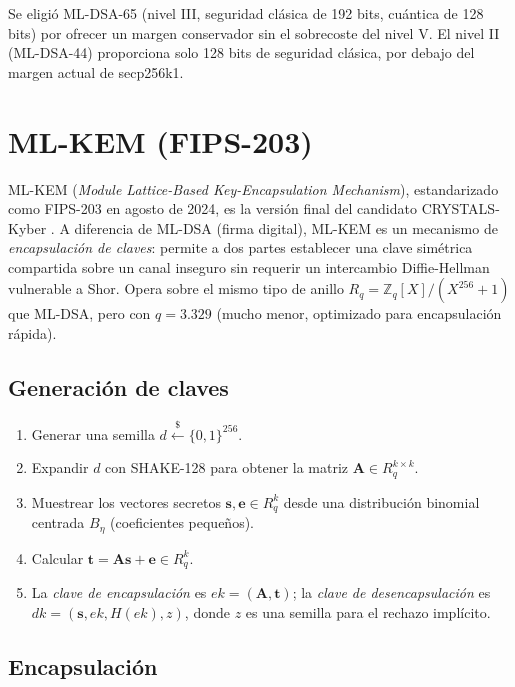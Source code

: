 Se eligió ML-DSA-65 (nivel III, seguridad clásica de 192 bits, cuántica de 128 bits) por ofrecer un margen conservador sin el sobrecoste del nivel V. El nivel II (ML-DSA-44) proporciona solo 128 bits de seguridad clásica, por debajo del margen actual de secp256k1.


\section{ML-KEM (FIPS-203)}
\label{sec:mlkem}

ML-KEM (\emph{Module Lattice-Based Key-Encapsulation Mechanism}), estandarizado como FIPS-203 \parencite{nistfips203} en agosto de 2024, es la versión final del candidato CRYSTALS-Kyber \parencite{bos2018kyber}. A diferencia de ML-DSA (firma digital), ML-KEM es un mecanismo de \emph{encapsulación de claves}: permite a dos partes establecer una clave simétrica compartida sobre un canal inseguro sin requerir un intercambio Diffie-Hellman vulnerable a Shor. Opera sobre el mismo tipo de anillo $R_q = \mathbb{Z}_q[X]/(X^{256}+1)$ que ML-DSA, pero con $q = 3.329$ (mucho menor, optimizado para encapsulación rápida).

\subsection{Generación de claves}

\begin{enumerate}
  \item Generar una semilla $d \xleftarrow{\$} \{0,1\}^{256}$.
  \item Expandir $d$ con SHAKE-128 para obtener la matriz $\mathbf{A} \in R_q^{k \times k}$.
  \item Muestrear los vectores secretos $\mathbf{s}, \mathbf{e} \in R_q^k$ desde una distribución binomial centrada $B_\eta$ (coeficientes pequeños).
  \item Calcular $\mathbf{t} = \mathbf{A}\mathbf{s} + \mathbf{e} \in R_q^k$.
  \item La \emph{clave de encapsulación} es $ek = (\mathbf{A}, \mathbf{t})$; la \emph{clave de desencapsulación} es $dk = (\mathbf{s}, ek, H(ek), z)$, donde $z$ es una semilla para el rechazo implícito.
\end{enumerate}

\subsection{Encapsulación}

